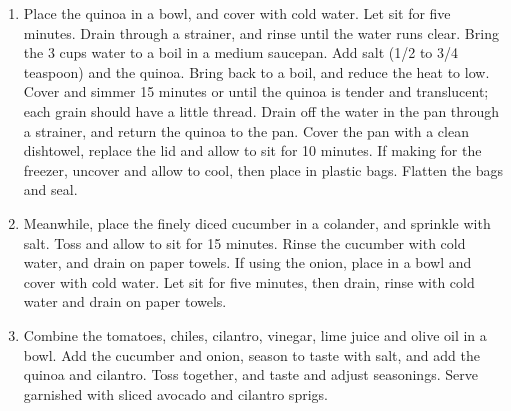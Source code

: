 
\begin{ingredients}
\end{ingredients}


\begin{recipe}
  \begin{enumerate}

  \item Place the quinoa in a bowl, and cover with cold water. Let sit
    for five minutes. Drain through a strainer, and rinse until the
    water runs clear. Bring the 3 cups water to a boil in a medium
    saucepan. Add salt (1/2 to 3/4 teaspoon) and the quinoa. Bring
    back to a boil, and reduce the heat to low. Cover and simmer 15
    minutes or until the quinoa is tender and translucent; each grain
    should have a little thread. Drain off the water in the pan
    through a strainer, and return the quinoa to the pan. Cover the
    pan with a clean dishtowel, replace the lid and allow to sit for
    10 minutes. If making for the freezer, uncover and allow to cool,
    then place in plastic bags. Flatten the bags and seal.

  \item Meanwhile, place the finely diced cucumber in a colander, and
    sprinkle with salt. Toss and allow to sit for 15 minutes. Rinse
    the cucumber with cold water, and drain on paper towels. If using
    the onion, place in a bowl and cover with cold water. Let sit for
    five minutes, then drain, rinse with cold water and drain on paper
    towels.

  \item Combine the tomatoes, chiles, cilantro, vinegar, lime juice
    and olive oil in a bowl. Add the cucumber and onion, season to
    taste with salt, and add the quinoa and cilantro. Toss together,
    and taste and adjust seasonings. Serve garnished with sliced
    avocado and cilantro sprigs.
    

  \end{enumerate}
\end{recipe}

